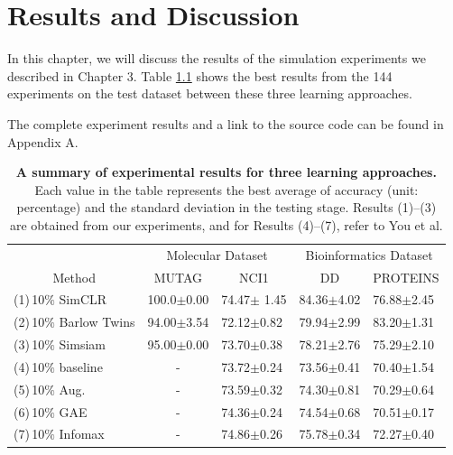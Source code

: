 
\chapter{Results and Discussion}

In this chapter, we will discuss the results of the simulation experiments we described in Chapter 3. Table \ref{tab:result} shows the best results from the 144 experiments on the test dataset between these three learning approaches.

The complete experiment results and a link to the source code can be found in Appendix A. 

\begin{table}[!htbp]
\centering
\begin{tabular}{l|ll|ll}
\toprule
\multicolumn{1}{c|}{}       & \multicolumn{2}{c|}{Molecular Dataset}                & \multicolumn{2}{c}{Bioinformatics Dataset}           \\ \cline{2-5} 
\multicolumn{1}{c|}{Method} & \multicolumn{1}{c}{MUTAG} & \multicolumn{1}{c|}{NCI1} & \multicolumn{1}{c}{DD} & \multicolumn{1}{c}{PROTEINS} \\ \midrule
(1)\,10$\%$ SimCLR                 & 100.0$\pm$0.00             & 74.47$\pm$ 1.45            & 84.36$\pm$4.02           & 76.88$\pm$2.45                \\
(2)\,10$\%$ Barlow Twins           & 94.00$\pm$3.54              & 72.12$\pm$0.82              & 79.94$\pm$2.99           & 83.20$\pm$1.31                \\
(3)\,10$\%$ Simsiam                & 95.00$\pm$0.00              & 73.70$\pm$0.38              & 78.21$\pm$2.76           & 75.29$\pm$2.10                \\ \midrule
(4)\,10$\%$ baseline               & \multicolumn{1}{c}{-}     & 73.72$\pm$0.24              & 73.56$\pm$0.41           & 70.40$\pm$1.54                \\
(5)\,10$\%$ Aug.                   & \multicolumn{1}{c}{-}                         & 73.59$\pm$0.32              & 74.30$\pm$0.81           & 70.29$\pm$0.64                \\
(6)\,10$\%$ GAE                    & \multicolumn{1}{c}{-}                         & 74.36$\pm$0.24              & 74.54$\pm$0.68           & 70.51$\pm$0.17                \\
(7)\,10$\%$ Infomax                & \multicolumn{1}{c}{-}                        & 74.86$\pm$0.26              & 75.78$\pm$0.34           & 72.27$\pm$0.40  
\\
\bottomrule
\end{tabular}
\vspace{0.5cm}
\caption[A summary of experimental results in three learning approaches]{\textbf{A summary of experimental results for three learning approaches.} Each value in the table represents the best average of accuracy (unit: percentage) and the standard deviation in the testing stage. Results (1)–(3) are obtained from our experiments, and for Results (4)–(7), refer to You et al. \cite{GraphCL}}
		\label{tab:result}
\end{table}



